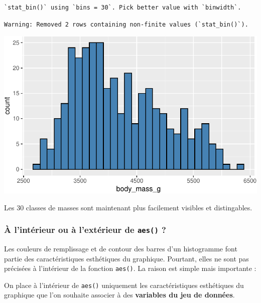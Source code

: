 \documentclass[
  a4paper,
  DIV=11,
  numbers=noendperiod,
  oneside]{scrreprt}
\begin{document}
\begin{verbatim}
`stat_bin()` using `bins = 30`. Pick better value with `binwidth`.
\end{verbatim}

\begin{verbatim}
Warning: Removed 2 rows containing non-finite values (`stat_bin()`).
\end{verbatim}

\includegraphics{03-visualization_files/figure-pdf/unnamed-chunk-10-1.pdf}

Les 30 classes de masses sont maintenant plus facilement visibles et
distingables.

\subsubsection{\texorpdfstring{À l'intérieur ou à l'extérieur de
\texttt{aes()}
?}{À l'intérieur ou à l'extérieur de aes() ?}}\label{uxe0-lintuxe9rieur-ou-uxe0-lextuxe9rieur-de-aes}

Les couleurs de remplissage et de contour des barres d'un histogramme
font partie des caractéristiques esthétiques du graphique. Pourtant,
elles ne sont pas précisées à l'intérieur de la fonction \texttt{aes()}.
La raison est simple mais importante :

\begin{tcolorbox}[enhanced jigsaw, colbacktitle=quarto-callout-important-color!10!white, left=2mm, leftrule=.75mm, titlerule=0mm, bottomtitle=1mm, colback=white, breakable, arc=.35mm, bottomrule=.15mm, toprule=.15mm, toptitle=1mm, opacitybacktitle=0.6, title=\textcolor{quarto-callout-important-color}{\faExclamation}\hspace{0.5em}{Important}, coltitle=black, rightrule=.15mm, opacityback=0, colframe=quarto-callout-important-color-frame]

On place à l'intérieur de \texttt{aes()} uniquement les caractéristiques
esthétiques du graphique que l'on souhaite associer à des
\textbf{variables du jeu de données}.

\end{tcolorbox}
\end{document}

